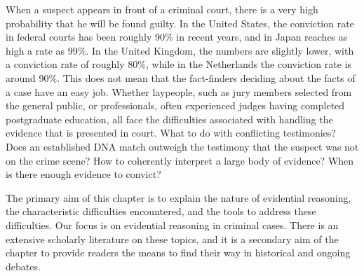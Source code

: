 \documentclass[10pt]{article}
\begin{document}
\noindent When a suspect appears in front of a criminal court, there is a very high probability that he will be found guilty. 
In the United States, the conviction rate in federal courts has been roughly 90\% in recent years, and in Japan reaches as high a rate as 99\%. 
In the United Kingdom, the numbers are slightly lower, with a conviction rate of roughly 80\%, while in the Netherlands 
the conviction rate is around 90\%. 
This does not mean that the fact-finders deciding about the facts of a case have an easy job. Whether laypeople, such as jury members selected from the general public, or professionals, often experienced judges having completed postgraduate education, all face the difficulties associated with handling the evidence that is presented in court. What to do with conflicting testimonies? Does an established DNA match outweigh the testimony that the suspect was not on the crime scene? How to coherently interpret a large body of evidence? 
When is there enough evidence to convict? %

The primary aim of this chapter is to explain the nature of evidential reasoning, the characteristic difficulties encountered, and the tools to address these difficulties. 
Our focus is on evidential reasoning in criminal cases. There is an extensive scholarly literature on these topics, 
and it is a secondary aim of the chapter to provide readers the means to find their way in historical and ongoing debates. 


\end{document}
